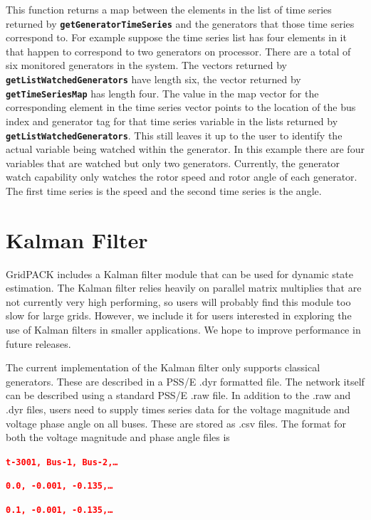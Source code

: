 \documentclass[12pt]{report} %
\begin{document}
This function returns a map between the elements in the list of time series returned by \texttt{\textbf{getGeneratorTimeSeries}} and the generators that those time series correspond to. For example suppose the time series list has four elements in it that happen to correspond to two generators on processor. There are a total of six monitored generators in the system. The vectors returned by \texttt{\textbf{getListWatchedGenerators}} have length six, the vector returned by \texttt{\textbf{getTimeSeriesMap}} has length four. The value in the map vector for the corresponding element in the time series vector points to the location of the bus index and generator tag for that time series variable in the lists returned by \texttt{\textbf{getListWatchedGenerators}}. This still leaves it up to the user to identify the actual variable being watched within the generator. In this example there are four variables that are watched but only two generators. Currently, the generator watch capability only watches the rotor speed and rotor angle of each generator. The first time series is the speed and the second time series is the angle.

\section{Kalman Filter}

GridPACK includes a Kalman filter module that can be used for dynamic state estimation. The Kalman filter relies heavily on parallel matrix multiplies that are not currently very high performing, so users will probably find this module too slow for large grids. However, we include it for users interested in exploring the use of Kalman filters in smaller applications. We hope to improve performance in future releases.

The current implementation of the Kalman filter only supports classical generators. These are described in a PSS/E .dyr formatted file. The network itself can be described using a standard PSS/E .raw file. In addition to the .raw and .dyr files, users need to supply times series data for the voltage magnitude and voltage phase angle on all buses. These are stored as .csv files. The format for both the voltage magnitude and phase angle files is

\textcolor{red}{\texttt{\textbf{t-3001,  Bus-1,  Bus-2,{\dots}}}}

\textcolor{red}{\texttt{\textbf{0.0,    -0.001, -0.135,{\dots}}}}

\textcolor{red}{\texttt{\textbf{0.1,    -0.001, -0.135,{\dots}}}}
\end{document}
